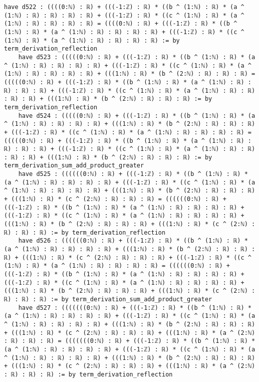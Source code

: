 \documentclass{article}
\begin{document}
\begin{tcolorbox}[colback=white!10, width=\linewidth]
\begin{lstlisting}[language=Lean4]
    have d522 : ((((0:ℕ) : ℝ) + (((-1:ℤ) : ℝ) * ((b ^ (1:ℕ) : ℝ) * (a ^ (1:ℕ) : ℝ) : ℝ) : ℝ) : ℝ) + (((-1:ℤ) : ℝ) * ((c ^ (1:ℕ) : ℝ) * (a ^ (1:ℕ) : ℝ) : ℝ) : ℝ) : ℝ) = ((((0:ℕ) : ℝ) + (((-1:ℤ) : ℝ) * ((b ^ (1:ℕ) : ℝ) * (a ^ (1:ℕ) : ℝ) : ℝ) : ℝ) : ℝ) + (((-1:ℤ) : ℝ) * ((c ^ (1:ℕ) : ℝ) * (a ^ (1:ℕ) : ℝ) : ℝ) : ℝ) : ℝ) := by term_derivation_reflection
    have d523 : (((((0:ℕ) : ℝ) + (((-1:ℤ) : ℝ) * ((b ^ (1:ℕ) : ℝ) * (a ^ (1:ℕ) : ℝ) : ℝ) : ℝ) : ℝ) + (((-1:ℤ) : ℝ) * ((c ^ (1:ℕ) : ℝ) * (a ^ (1:ℕ) : ℝ) : ℝ) : ℝ) : ℝ) + (((1:ℕ) : ℝ) * (b ^ (2:ℕ) : ℝ) : ℝ) : ℝ) = (((((0:ℕ) : ℝ) + (((-1:ℤ) : ℝ) * ((b ^ (1:ℕ) : ℝ) * (a ^ (1:ℕ) : ℝ) : ℝ) : ℝ) : ℝ) + (((-1:ℤ) : ℝ) * ((c ^ (1:ℕ) : ℝ) * (a ^ (1:ℕ) : ℝ) : ℝ) : ℝ) : ℝ) + (((1:ℕ) : ℝ) * (b ^ (2:ℕ) : ℝ) : ℝ) : ℝ) := by term_derivation_reflection
    have d524 : (((((0:ℕ) : ℝ) + (((-1:ℤ) : ℝ) * ((b ^ (1:ℕ) : ℝ) * (a ^ (1:ℕ) : ℝ) : ℝ) : ℝ) : ℝ) + (((1:ℕ) : ℝ) * (b ^ (2:ℕ) : ℝ) : ℝ) : ℝ) + (((-1:ℤ) : ℝ) * ((c ^ (1:ℕ) : ℝ) * (a ^ (1:ℕ) : ℝ) : ℝ) : ℝ) : ℝ) = (((((0:ℕ) : ℝ) + (((-1:ℤ) : ℝ) * ((b ^ (1:ℕ) : ℝ) * (a ^ (1:ℕ) : ℝ) : ℝ) : ℝ) : ℝ) + (((-1:ℤ) : ℝ) * ((c ^ (1:ℕ) : ℝ) * (a ^ (1:ℕ) : ℝ) : ℝ) : ℝ) : ℝ) + (((1:ℕ) : ℝ) * (b ^ (2:ℕ) : ℝ) : ℝ) : ℝ) := by term_derivation_sum_add_product_greater
    have d525 : ((((((0:ℕ) : ℝ) + (((-1:ℤ) : ℝ) * ((b ^ (1:ℕ) : ℝ) * (a ^ (1:ℕ) : ℝ) : ℝ) : ℝ) : ℝ) + (((-1:ℤ) : ℝ) * ((c ^ (1:ℕ) : ℝ) * (a ^ (1:ℕ) : ℝ) : ℝ) : ℝ) : ℝ) + (((1:ℕ) : ℝ) * (b ^ (2:ℕ) : ℝ) : ℝ) : ℝ) + (((1:ℕ) : ℝ) * (c ^ (2:ℕ) : ℝ) : ℝ) : ℝ) = ((((((0:ℕ) : ℝ) + (((-1:ℤ) : ℝ) * ((b ^ (1:ℕ) : ℝ) * (a ^ (1:ℕ) : ℝ) : ℝ) : ℝ) : ℝ) + (((-1:ℤ) : ℝ) * ((c ^ (1:ℕ) : ℝ) * (a ^ (1:ℕ) : ℝ) : ℝ) : ℝ) : ℝ) + (((1:ℕ) : ℝ) * (b ^ (2:ℕ) : ℝ) : ℝ) : ℝ) + (((1:ℕ) : ℝ) * (c ^ (2:ℕ) : ℝ) : ℝ) : ℝ) := by term_derivation_reflection
    have d526 : ((((((0:ℕ) : ℝ) + (((-1:ℤ) : ℝ) * ((b ^ (1:ℕ) : ℝ) * (a ^ (1:ℕ) : ℝ) : ℝ) : ℝ) : ℝ) + (((1:ℕ) : ℝ) * (b ^ (2:ℕ) : ℝ) : ℝ) : ℝ) + (((1:ℕ) : ℝ) * (c ^ (2:ℕ) : ℝ) : ℝ) : ℝ) + (((-1:ℤ) : ℝ) * ((c ^ (1:ℕ) : ℝ) * (a ^ (1:ℕ) : ℝ) : ℝ) : ℝ) : ℝ) = ((((((0:ℕ) : ℝ) + (((-1:ℤ) : ℝ) * ((b ^ (1:ℕ) : ℝ) * (a ^ (1:ℕ) : ℝ) : ℝ) : ℝ) : ℝ) + (((-1:ℤ) : ℝ) * ((c ^ (1:ℕ) : ℝ) * (a ^ (1:ℕ) : ℝ) : ℝ) : ℝ) : ℝ) + (((1:ℕ) : ℝ) * (b ^ (2:ℕ) : ℝ) : ℝ) : ℝ) + (((1:ℕ) : ℝ) * (c ^ (2:ℕ) : ℝ) : ℝ) : ℝ) := by term_derivation_sum_add_product_greater
    have d527 : (((((((0:ℕ) : ℝ) + (((-1:ℤ) : ℝ) * ((b ^ (1:ℕ) : ℝ) * (a ^ (1:ℕ) : ℝ) : ℝ) : ℝ) : ℝ) + (((-1:ℤ) : ℝ) * ((c ^ (1:ℕ) : ℝ) * (a ^ (1:ℕ) : ℝ) : ℝ) : ℝ) : ℝ) + (((1:ℕ) : ℝ) * (b ^ (2:ℕ) : ℝ) : ℝ) : ℝ) + (((1:ℕ) : ℝ) * (c ^ (2:ℕ) : ℝ) : ℝ) : ℝ) + (((1:ℕ) : ℝ) * (a ^ (2:ℕ) : ℝ) : ℝ) : ℝ) = (((((((0:ℕ) : ℝ) + (((-1:ℤ) : ℝ) * ((b ^ (1:ℕ) : ℝ) * (a ^ (1:ℕ) : ℝ) : ℝ) : ℝ) : ℝ) + (((-1:ℤ) : ℝ) * ((c ^ (1:ℕ) : ℝ) * (a ^ (1:ℕ) : ℝ) : ℝ) : ℝ) : ℝ) + (((1:ℕ) : ℝ) * (b ^ (2:ℕ) : ℝ) : ℝ) : ℝ) + (((1:ℕ) : ℝ) * (c ^ (2:ℕ) : ℝ) : ℝ) : ℝ) + (((1:ℕ) : ℝ) * (a ^ (2:ℕ) : ℝ) : ℝ) : ℝ) := by term_derivation_reflection

\end{lstlisting}
\end{tcolorbox}
\end{document}
